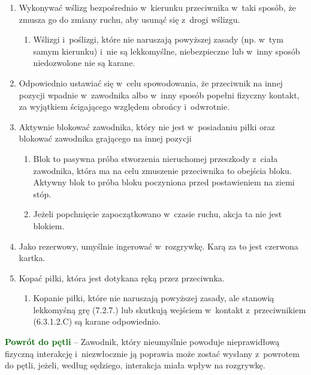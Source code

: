 \documentclass[12pt,a4paper]{article}
\newcommand\other[1]{\bgroup\textcolor{darkgreen}{\textbf{#1}}}
\begin{document}
\begin{enumerate}
	\item
	      Wykonywać wślizg bezpośrednio w~kierunku przeciwnika w~taki sposób, że
	      zmusza go do zmiany ruchu, aby usunąć się z~drogi wślizgu.

	      \begin{enumerate}
		      \item
		            Wślizgi i~poślizgi, które nie naruszają powyższej zasady (np. w~tym
		            samym kierunku) i~nie są lekkomyślne, niebezpieczne lub w~inny
		            sposób niedozwolone nie są karane.
	      \end{enumerate}
	\item
	      Odpowiednio ustawiać się w~celu spowodowania, że przeciwnik na innej
	      pozycji wpadnie w~zawodnika albo w~inny sposób popełni fizyczny
	      kontakt, za wyjątkiem ścigającego względem obrońcy i~odwrotnie.
	\item
	      Aktywnie blokować zawodnika, który nie jest w~posiadaniu piłki oraz
	      blokować zawodnika grającego na innej pozycji

	      \begin{enumerate}
		      \item
		            Blok to pasywna próba stworzenia nieruchomej przeszkody z~ciała
		            zawodnika, która ma na celu zmuszenie przeciwnika to obejścia bloku.
		            Aktywny blok to próba bloku poczyniona przed postawieniem na ziemi
		            stóp.
		      \item
		            Jeżeli popchnięcie zapoczątkowano w~czasie ruchu, akcja ta nie jest
		            blokiem.
	      \end{enumerate}
	\item
	      Jako rezerwowy, umyślnie ingerować w~rozgrywkę. Karą za to jest
	      czerwona kartka.
	\item
	      Kopać piłki, która jest dotykana ręką przez przeciwnka.

	      \begin{enumerate}
		      \item
		            Kopanie piłki, które nie naruszają powyższej zasady, ale stanowią
		            lekkomyśną grę (7.2.7.) lub skutkują wejściem w~kontakt z~przeciwnikiem (6.3.1.2.C) są karane odpowiednio.
	      \end{enumerate}
\end{enumerate}

\other{Powrót do pętli} -- Zawodnik, który nieumyślnie powoduje
nieprawidłową fizyczną interakcję i~niezwłocznie ją poprawia może zostać
wysłany z~powrotem do pętli, jeżeli, według sędziego, interakcja miała
wpływ na rozgrywkę.
\end{document}
